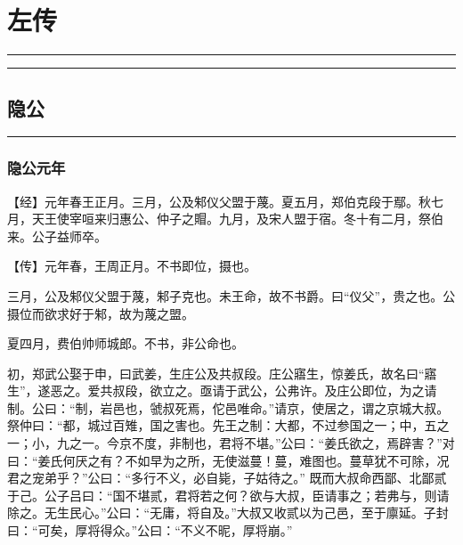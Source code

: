 \documentclass[]{article}
\date{}
\begin{document}
\hypertarget{header-n0}{%
\section{左传}\label{header-n0}}

\begin{center}\rule{0.5\linewidth}{\linethickness}\end{center}

\tableofcontents

\begin{center}\rule{0.5\linewidth}{\linethickness}\end{center}

\hypertarget{header-n7}{%
\subsection{隐公}\label{header-n7}}

\begin{center}\rule{0.5\linewidth}{\linethickness}\end{center}

\hypertarget{header-n9}{%
\subsubsection{隐公元年}\label{header-n9}}

【经】元年春王正月。三月，公及邾仪父盟于蔑。夏五月，郑伯克段于鄢。秋七月，天王使宰咺来归惠公、仲子之賵。九月，及宋人盟于宿。冬十有二月，祭伯来。公子益师卒。

【传】元年春，王周正月。不书即位，摄也。

三月，公及邾仪父盟于蔑，邾子克也。未王命，故不书爵。曰``仪父''，贵之也。公摄位而欲求好于邾，故为蔑之盟。

夏四月，费伯帅师城郎。不书，非公命也。

初，郑武公娶于申，曰武姜，生庄公及共叔段。庄公寤生，惊姜氏，故名曰``寤生''，遂恶之。爱共叔段，欲立之。亟请于武公，公弗许。及庄公即位，为之请制。公曰：``制，岩邑也，虢叔死焉，佗邑唯命。''请京，使居之，谓之京城大叔。祭仲曰：``都，城过百雉，国之害也。先王之制：大都，不过参国之一；中，五之一；小，九之一。今京不度，非制也，君将不堪。''公曰：``姜氏欲之，焉辟害？''对曰：``姜氏何厌之有？不如早为之所，无使滋蔓！蔓，难图也。蔓草犹不可除，况君之宠弟乎？''公曰：``多行不义，必自毙，子姑待之。''
既而大叔命西鄙、北鄙贰于己。公子吕曰：``国不堪贰，君将若之何？欲与大叔，臣请事之；若弗与，则请除之。无生民心。''公曰：``无庸，将自及。''大叔又收贰以为己邑，至于廪延。子封曰：``可矣，厚将得众。''公曰：``不义不昵，厚将崩。''
\end{document}
